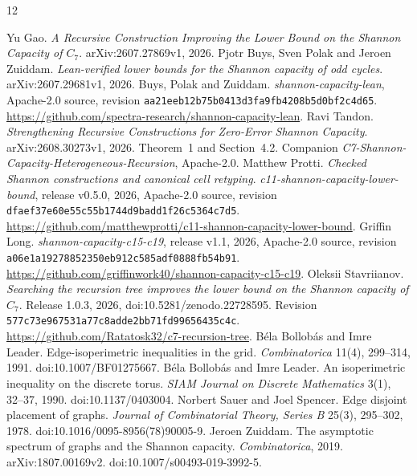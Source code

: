\documentclass[11pt,a4paper]{article}
\theoremstyle{definition}
\theoremstyle{remark}
\begin{document}
\begin{thebibliography}{12}
\raggedright
{} Yu Gao.
\emph{A Recursive Construction Improving the Lower Bound on the Shannon
Capacity of $C_7$}. arXiv:2607.27869v1, 2026.
 Pjotr Buys, Sven Polak and Jeroen Zuiddam.
\emph{Lean-verified lower bounds for the Shannon capacity of odd cycles}.
arXiv:2607.29681v1, 2026.
 Buys, Polak and Zuiddam.
\emph{shannon-capacity-lean}, Apache-2.0 source, revision
\texttt{aa21eeb12b75b0413d3fa9fb4208b5d0bf2c4d65}.
\url{https://github.com/spectra-research/shannon-capacity-lean}.
 Ravi Tandon.
\emph{Strengthening Recursive Constructions for Zero-Error Shannon
Capacity}. arXiv:2608.30273v1, 2026. Theorem~1 and Section~4.2.
Companion \emph{C7-Shannon-Capacity-Heterogeneous-Recursion}, Apache-2.0.
 Matthew Protti.
\emph{Checked Shannon constructions and canonical cell retyping}.
\emph{c11-shannon-capacity-lower-bound}, release v0.5.0, 2026,
Apache-2.0 source, revision
\texttt{dfaef37e60e55c55b1744d9badd1f26c5364c7d5}.
\url{https://github.com/matthewprotti/c11-shannon-capacity-lower-bound}.
 Griffin Long.
\emph{shannon-capacity-c15-c19}, release v1.1, 2026, Apache-2.0
source, revision \texttt{a06e1a19278852350eb912c585adf0888fb54b91}.
\url{https://github.com/griffinwork40/shannon-capacity-c15-c19}.
 Oleksii Stavriianov.
\emph{Searching the recursion tree improves the lower bound on the
Shannon capacity of $C_7$}. Release 1.0.3, 2026,
doi:10.5281/zenodo.22728595. Revision
\texttt{577c73e967531a77c8adde2bb71fd99656435c4c}.
\url{https://github.com/Ratatosk32/c7-recursion-tree}.
 B\'ela Bollob\'as and Imre Leader.
Edge-isoperimetric inequalities in the grid.
\emph{Combinatorica} 11(4), 299--314, 1991.
doi:10.1007/BF01275667.
 B\'ela Bollob\'as and Imre Leader.
An isoperimetric inequality on the discrete torus.
\emph{SIAM Journal on Discrete Mathematics} 3(1), 32--37, 1990.
doi:10.1137/0403004.
 Norbert Sauer and Joel Spencer.
Edge disjoint placement of graphs.
\emph{Journal of Combinatorial Theory, Series B} 25(3), 295--302, 1978.
doi:10.1016/0095-8956(78)90005-9.
 Jeroen Zuiddam.
The asymptotic spectrum of graphs and the Shannon capacity.
\emph{Combinatorica}, 2019. arXiv:1807.00169v2.
doi:10.1007/s00493-019-3992-5.
\end{thebibliography}
\end{document}
